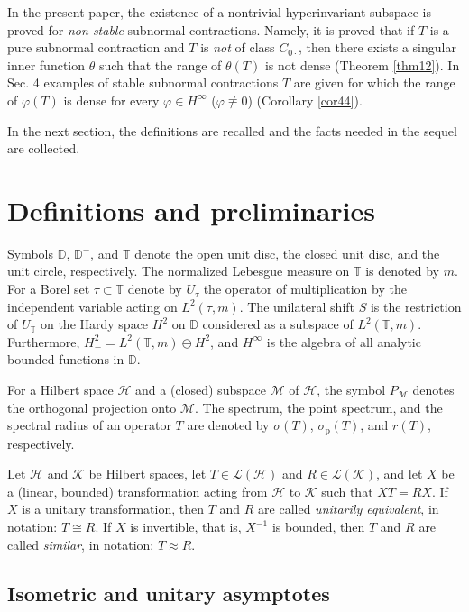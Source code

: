\documentclass[a4paper,oneside,11pt]{amsart}
\numberwithin{equation}{section}
\theoremstyle{plain}
\theoremstyle{definition}
\begin{document}
In the present paper, 
 the existence of a nontrivial hyperinvariant subspace is proved for \emph{non-stable} subnormal contractions. 
Namely, it is proved that if $T$ is a pure subnormal contraction and $T$ is \emph{not} of class $C_{0\cdot}$, 
then there exists a singular inner function $\theta$ such that the range of $\theta(T)$ is not dense (Theorem \ref{thm12}).   In  Sec. 4 examples of stable subnormal contractions $T$ are given for which the range of $\varphi(T)$ is dense 
for every $\varphi\in H^\infty$ ($\varphi\not\equiv 0$) (Corollary \ref{cor44}). 

In the next section, the definitions are recalled and the facts needed in the sequel are collected. 

\section{Definitions and preliminaries}
Symbols $\mathbb D$, $\mathbb D^-$, and $\mathbb T$ denote the open unit disc, the closed unit disc, 
and the unit circle, respectively. The normalized Lebesgue measure on $\mathbb T$ is denoted by $m$. 
For a Borel set $\tau\subset\mathbb T$ 
denote by $U_\tau$ the operator of multiplication by the independent variable acting on $L^2(\tau,m)$.
 The unilateral shift $S$ is the restriction of $U_{\mathbb T}$ on the Hardy space $H^2$ on 
$\mathbb D$ considered as a subspace of $L^2(\mathbb T,m)$.  Furthermore,  
$H^2_-=L^2(\mathbb T,m)\ominus H^2$, and $H^\infty$ is the algebra of all analytic bounded functions in $\mathbb D$. 

For a Hilbert space  $\mathcal H$ and a (closed) subspace  $\mathcal M$ of $\mathcal H$, the symbol  $P_{\mathcal M}$   denotes the orthogonal projection onto $\mathcal M$. The spectrum, the  point spectrum, and the spectral radius  of an operator $T$ are denoted by $\sigma(T)$,   
$\sigma_{\mathrm{p}}(T)$, and $r(T)$, respectively. 

Let  $\mathcal H$ and $\mathcal K$ be Hilbert spaces,   let $T\in\mathcal L(\mathcal H)$ and  $R\in\mathcal L(\mathcal K)$, 
and let $X$ be a (linear, bounded) transformation acting from $\mathcal H$ to $\mathcal  K$ such that $XT=RX$. 
If $X$ is a unitary transformation, then $T$ and $R$ 
are called  \emph{unitarily equivalent}, in notation: $T\cong R$.  If $X$ is invertible, that is, $X^{-1}$ is bounded, 
then $T$ and $R$ are called \emph{similar}, in notation: $T\approx R$.

 

\subsection{Isometric and unitary asymptotes}
 
\end{document}
